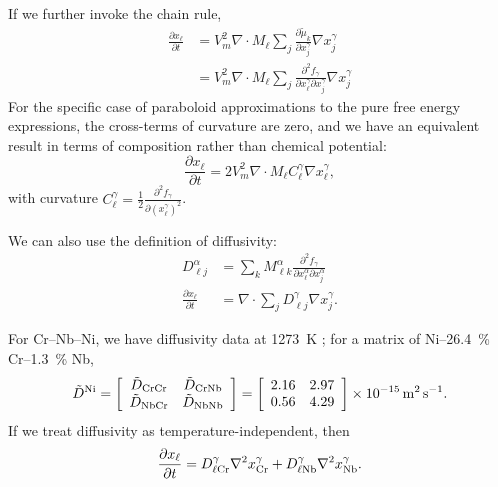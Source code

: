 \documentclass[10pt]{article}
\begin{document}
		If we further invoke the chain rule,
		\begin{align}
			\frac{\partial x_{\ell}}{\partial t} &= V_m^2 \nabla\cdot M_{\ell}\sum_j\frac{\partial \tilde{\mu}_k}{\partial x_j^{\gamma}}\nabla x_j^{\gamma}\\
			                                     &= V_m^2 \nabla\cdot M_{\ell}\sum_j\frac{\partial^2 f_{\gamma}}{\partial x_{\ell}^{\gamma} \partial x_j^{\gamma}}\nabla x_j^{\gamma}
		\end{align}
		For the specific case of paraboloid approximations to the pure free energy expressions, the cross-terms of curvature are zero,
		and we have an equivalent result in terms of composition rather than chemical potential:
		\begin{equation}
			\frac{\partial x_{\ell}}{\partial t} = 2V_m^2 \nabla\cdot M_{\ell}C_{\ell}^{\gamma}\nabla x_{\ell}^{\gamma},\label{eqn:interdiff}
		\end{equation}
		with curvature $C_{\ell}^{\gamma}=\frac{1}{2}\frac{\partial^2 f_{\gamma}}{\partial \left({x_{\ell}^{\gamma}}\right)^2}$.
		
		We can also use the definition of diffusivity:
		\begin{align}
			D_{\ell j}^{\alpha} &= \sum_k M_{\ell k}^{\alpha}\frac{\partial^2 f_{\gamma}}{\partial x_{\ell}^{\alpha} \partial x_j^{\alpha}}\\
			\frac{\partial x_{\ell}}{\partial t} &= \nabla\cdot\sum_j D_{\ell j}^{\gamma} \nabla x_j^{\gamma}.
		\end{align}

		For Cr--Nb--Ni, we have diffusivity data at \SI{1273}{\kelvin} \cite{Xu2016};
		for a matrix of Ni--\SI{26.4}{\percent} Cr--\SI{1.3}{\percent} Nb,
		\begin{equation}\label{eqn:diffusion}
			\tilde{D}^{\ce{Ni}} = \left[\begin{array}{cc}
			                            \tilde{D}_{\mathrm{CrCr}} & \tilde{D}_{\mathrm{CrNb}}\\
			                            \tilde{D}_{\mathrm{NbCr}} & \tilde{D}_{\mathrm{NbNb}}
		                                \end{array}
		                          \right]
			                    = \left[\begin{array}{cc}
			                            2.16 & 2.97\\
			                            0.56 & 4.29
		                                \end{array}
		                          \right] \times \SI{e-15}{\meter\squared\per\second}.
		\end{equation}
		If we treat diffusivity as temperature-independent, then
		\begin{equation}
			\frac{\partial x_{\ell}}{\partial t} = D_{\ell\ce{Cr}}^{\gamma}\nabla^2 x_{\ce{Cr}}^{\gamma} + D_{\ell\ce{Nb}}^{\gamma}\nabla^2 x_{\ce{Nb}}^{\gamma}.
		\end{equation}
	
\end{document}
